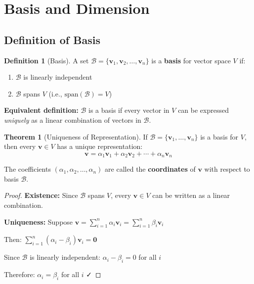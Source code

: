 \documentclass[12pt,a4paper]{article}
\theoremstyle{definition}
\newtheorem{definition}{Definition}[section]
\newtheorem{theorem}{Theorem}[section]
\begin{document}
\section{Basis and Dimension}

\subsection{Definition of Basis}

\begin{definition}[Basis]
A set $\mathcal{B} = \{\mathbf{v}_1, \mathbf{v}_2, \ldots, \mathbf{v}_n\}$ is a \textbf{basis} for vector space $V$ if:
\begin{enumerate}
    \item $\mathcal{B}$ is linearly independent
    \item $\mathcal{B}$ spans $V$ (i.e., $\text{span}(\mathcal{B}) = V$)
\end{enumerate}

\textbf{Equivalent definition:} $\mathcal{B}$ is a basis if every vector in $V$ can be expressed \textit{uniquely} as a linear combination of vectors in $\mathcal{B}$.
\end{definition}

\begin{theorem}[Uniqueness of Representation]
If $\mathcal{B} = \{\mathbf{v}_1, \ldots, \mathbf{v}_n\}$ is a basis for $V$, then every $\mathbf{v} \in V$ has a unique representation:
\begin{equation}
\mathbf{v} = \alpha_1\mathbf{v}_1 + \alpha_2\mathbf{v}_2 + \cdots + \alpha_n\mathbf{v}_n
\end{equation}

The coefficients $(\alpha_1, \alpha_2, \ldots, \alpha_n)$ are called the \textbf{coordinates} of $\mathbf{v}$ with respect to basis $\mathcal{B}$.
\end{theorem}

\begin{proof}
\textbf{Existence:} Since $\mathcal{B}$ spans $V$, every $\mathbf{v} \in V$ can be written as a linear combination.

\textbf{Uniqueness:} Suppose $\mathbf{v} = \sum_{i=1}^n \alpha_i\mathbf{v}_i = \sum_{i=1}^n \beta_i\mathbf{v}_i$

Then: $\sum_{i=1}^n (\alpha_i - \beta_i)\mathbf{v}_i = \mathbf{0}$

Since $\mathcal{B}$ is linearly independent: $\alpha_i - \beta_i = 0$ for all $i$

Therefore: $\alpha_i = \beta_i$ for all $i$ ✓
\end{proof}
\end{document}
